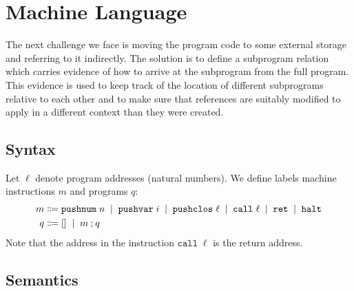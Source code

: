 \documentclass[12pt]{article}
\newcommand{\alt}{\;\; | \;\;}
\newcommand{\defi}{\Coloneqq}
\newcommand{\nil}{[]}
\newcommand{\D}{\mathcal{D}}
\newcommand{\mpushnum}[1]{\mathtt{pushnum} \; #1}
\newcommand{\mhalt}{\mathtt{halt}}
\newcommand{\mpushvar}[1]{\mathtt{pushvar} \; #1}
\newcommand{\mpushclos}[1]{\mathtt{pushclos} \; #1}
\newcommand{\mcall}[1]{\mathtt{call} \; #1}
\newcommand{\mret}{\mathtt{ret}}
\renewcommand{\c}{c} %
\renewcommand{\l}{\ell}
\begin{document}
\section*{Machine Language}
The next challenge we face is moving the program code to some external storage and referring to it indirectly.
The solution is to define a subprogram relation which carries evidence of how to arrive at the subprogram from the full program.
This evidence is used to keep track of the location of different subprograms relative to each other and to make sure that references are suitably modified to apply in a different context than they were created.


\subsection*{Syntax}

\renewcommand{\mpushnum}[1]{\mathtt{pushnum} \; #1}%
\renewcommand{\mpushvar}[1]{\mathtt{pushvar} \; #1}%
\renewcommand{\mpushclos}[1]{\mathtt{pushclos} \; #1}%
\renewcommand{\mcall}[1]{\mathtt{call} \; #1}%
\renewcommand{\mret}{\mathtt{ret}}%
\renewcommand{\mhalt}{\mathtt{halt}}%

Let $\l$ denote program addresses (natural numbers).
We define labels machine instructions $m$ and programs $q$:
\begin{align*}
  m &\defi \mpushnum{n} \alt \mpushvar{i} \alt \mpushclos{\l} \alt \mcall{\l} \alt \mret \alt \mhalt \\
  q &\defi \nil \alt m \seq q
\end{align*}
Note that the address in the instruction $\mcall{\l}$ is the return address.

\subsection*{Semantics}

\newcommand{\hm}{\hat{m}}
\renewcommand{\c}{\gamma}%
\renewcommand{\D}{\Delta}%
\end{document}
